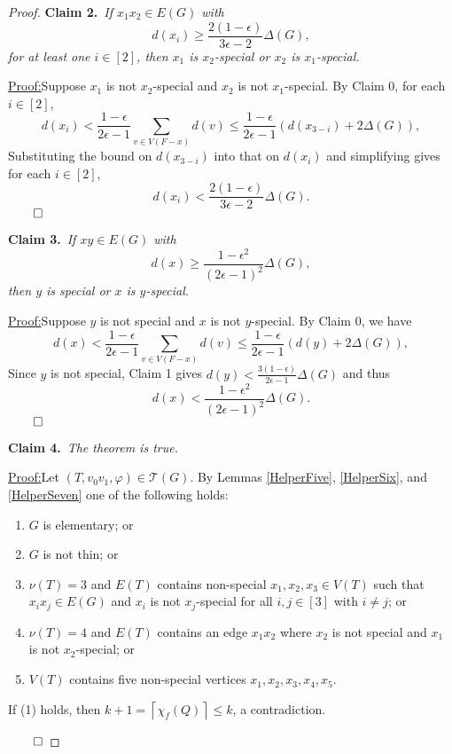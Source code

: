 \documentclass[12pt]{amsart}
\theoremstyle{plain}
\theoremstyle{definition}
\theoremstyle{remark}
\newcommand{\fancy}[1]{\mathcal{#1}}
\newcommand{\T}{\fancy{T}}
\newcommand{\ceil}[1]{\left\lceil#1\right\rceil}
\newcommand{\irange}[1]{\left[#1\right]}
\newcommand{\parens}[1]{\left( #1 \right)}
\newcommand{\vph}{\varphi}
\newcommand{\claim}[2]{{\noindent\bf Claim #1.}~{\it #2}~~}
\newenvironment{claimproof}[1]{\par\noindent\underline{Proof:}\space#1}{\leavevmode\unskip\penalty9999
\hbox{}\nobreak\hfill\quad\hbox{$\qed$}}
\begin{document}
\begin{proof}
\claim{2}{If $x_1x_2 \in E(G)$ with \[d(x_i) \ge \frac{2(1-\epsilon)}{3\epsilon - 2}\Delta(G),\] for at least one $i \in \irange{2}$, then $x_1$ is $x_2$-special or $x_2$ is $x_1$-special.}

\begin{claimproof}
Suppose $x_1$ is not $x_2$-special and $x_2$ is not $x_1$-special.  By Claim 0,
for each $i \in \irange{2}$,
\[d(x_i) < \frac{1-\epsilon}{2\epsilon -1}\sum_{v \in V(F-x)} d(v) \le
\frac{1-\epsilon}{2\epsilon -1}\parens{d(x_{3-i}) + 2\Delta(G)},\]
Substituting the bound on $d(x_{3-i})$ into that on $d(x_i)$ and simplifying
gives for each $i \in \irange{2}$,
\[d(x_i) < \frac{2(1-\epsilon)}{3\epsilon - 2}\Delta(G).\]
\end{claimproof}
\bigskip

\claim{3}{If $xy \in E(G)$ with \[d(x) \ge \frac{1 - \epsilon^2}{\parens{2\epsilon - 1}^2}\Delta(G),\] then $y$ is special or $x$ is $y$-special.}

\begin{claimproof}
Suppose $y$ is not special and $x$ is not $y$-special.  By Claim 0, we have
\[d(x) < \frac{1-\epsilon}{2\epsilon -1}\sum_{v \in V(F-x)} d(v) \le \frac{1-\epsilon}{2\epsilon -1}\parens{d(y) + 2\Delta(G)},\]
Since $y$ is not special, Claim 1 gives $d(y) < \frac{3(1-\epsilon)}{2\epsilon -1}\Delta(G)$ and thus
\[d(x) < \frac{1 - \epsilon^2}{\parens{2\epsilon - 1}^2}\Delta(G).\]
\end{claimproof}

\claim{4}{The theorem is true.}

\begin{claimproof}
Let $(T, v_0v_1, \vph) \in \T(G)$. By Lemmas \ref{HelperFive}, \ref{HelperSix},
and \ref{HelperSeven} one of the following holds:
\begin{enumerate}
\item $G$ is elementary; or
\item $G$ is not thin; or
\item $\nu(T) = 3$ and $E(T)$ contains non-special $x_1,x_2,x_3 \in V(T)$ such that $x_ix_j \in E(G)$ and $x_i$ is not $x_j$-special for all $i,j \in \irange{3}$ with $i \ne j$; or
\item $\nu(T) = 4$ and $E(T)$ contains an edge $x_1x_2$ where $x_2$ is not special and $x_1$ is not $x_2$-special; or
\item $V(T)$ contains five non-special vertices $x_1, x_2, x_3, x_4, x_5$.
\end{enumerate}

If (1) holds, then $k + 1 = \ceil{\chi_f(Q)} \le k$, a contradiction.


\end{claimproof}
\end{proof}
\end{document}
